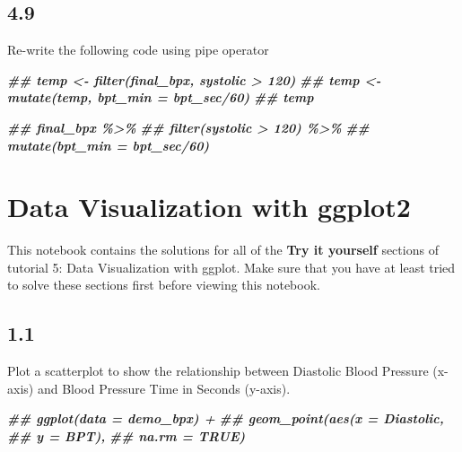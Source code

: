 \documentclass[
]{book}
\newenvironment{Shaded}{\begin{snugshade}}{\end{snugshade}}
\newcommand{\DocumentationTok}[1]{\textcolor[rgb]{0.56,0.35,0.01}{\textbf{\textit{#1}}}}
\begin{document}
\hypertarget{section-27}{%
\subsection{4.9}\label{section-27}}

Re-write the following code using pipe operator

\begin{Shaded}
\begin{Highlighting}[]
\DocumentationTok{\#\# temp \textless{}{-} filter(final\_bpx, systolic \textgreater{} 120)}
\DocumentationTok{\#\# temp \textless{}{-} mutate(temp, bpt\_min = bpt\_sec/60)}
\DocumentationTok{\#\# temp}
\end{Highlighting}
\end{Shaded}

\begin{Shaded}
\begin{Highlighting}[]
\DocumentationTok{\#\# final\_bpx \%\textgreater{}\%}
\DocumentationTok{\#\#    filter(systolic \textgreater{} 120) \%\textgreater{}\%}
\DocumentationTok{\#\#    mutate(bpt\_min = bpt\_sec/60)}
\end{Highlighting}
\end{Shaded}

\hypertarget{data-visualization-with-ggplot2-1}{%
\section{Data Visualization with ggplot2}\label{data-visualization-with-ggplot2-1}}

This notebook contains the solutions for all of the \textbf{Try it yourself} sections of tutorial 5: Data Visualization with ggplot. Make sure that you have at least tried to solve these sections first before viewing this notebook.

\hypertarget{section-28}{%
\subsection{1.1}\label{section-28}}

Plot a scatterplot to show the relationship between Diastolic Blood Pressure (x-axis) and Blood Pressure Time in Seconds (y-axis).

\begin{Shaded}
\begin{Highlighting}[]
\DocumentationTok{\#\# ggplot(data = demo\_bpx) +}
\DocumentationTok{\#\#   geom\_point(aes(x = Diastolic, }
\DocumentationTok{\#\#                  y = BPT), }
\DocumentationTok{\#\#              na.rm = TRUE)}
\end{Highlighting}
\end{Shaded}
\end{document}
